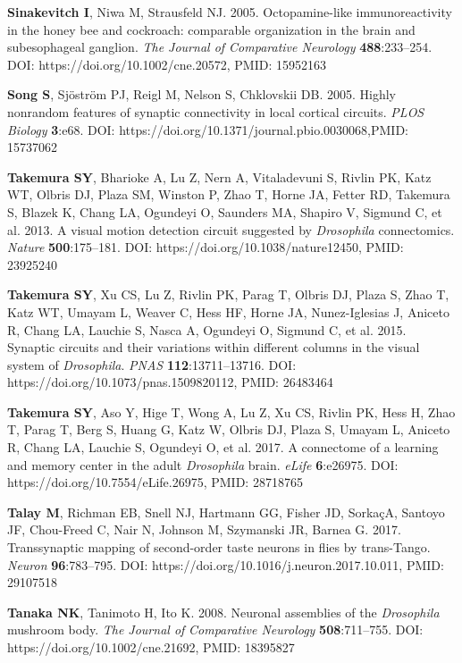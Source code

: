 \documentclass{article}
\begin{document}
\begin{hangpars}
\textbf{Sinakevitch I}, Niwa M, Strausfeld NJ. 2005. Octopamine-like immunoreactivity in the honey bee and cockroach: comparable organization in the brain and subesophageal ganglion. \emph{The Journal of Comparative Neurology} \textbf{488}:233–254. DOI: https://doi.org/10.1002/cne.20572, PMID: 15952163

\textbf{Song S}, Sjöström PJ, Reigl M, Nelson S, Chklovskii DB. 2005. Highly nonrandom features of synaptic connectivity in local cortical circuits. \emph{PLOS Biology} \textbf{3}:e68. DOI: https://doi.org/10.1371/journal.pbio.0030068,PMID: 15737062

\textbf{Takemura SY}, Bharioke A, Lu Z, Nern A, Vitaladevuni S, Rivlin PK, Katz WT, Olbris DJ, Plaza SM, Winston P, Zhao T, Horne JA, Fetter RD, Takemura S, Blazek K, Chang LA, Ogundeyi O, Saunders MA, Shapiro V, Sigmund C, et al. 2013. A visual motion detection circuit suggested by \emph{Drosophila} connectomics. \emph{Nature} \textbf{500}:175–181. DOI: https://doi.org/10.1038/nature12450, PMID: 23925240

\textbf{Takemura SY}, Xu CS, Lu Z, Rivlin PK, Parag T, Olbris DJ, Plaza S, Zhao T, Katz WT, Umayam L, Weaver C, Hess HF, Horne JA, Nunez-Iglesias J, Aniceto R, Chang LA, Lauchie S, Nasca A, Ogundeyi O, Sigmund C, et al. 2015. Synaptic circuits and their variations within different columns in the visual system of \emph{Drosophila}. \emph{PNAS} \textbf{112}:13711–13716. DOI: https://doi.org/10.1073/pnas.1509820112, PMID: 26483464

\textbf{Takemura SY}, Aso Y, Hige T, Wong A, Lu Z, Xu CS, Rivlin PK, Hess H, Zhao T, Parag T, Berg S, Huang G, Katz W, Olbris DJ, Plaza S, Umayam L, Aniceto R, Chang LA, Lauchie S, Ogundeyi O, et al. 2017. A connectome of a learning and memory center in the adult \emph{Drosophila} brain. \emph{eLife} \textbf{6}:e26975. DOI: https://doi.org/10.7554/eLife.26975, PMID: 28718765

\textbf{Talay M}, Richman EB, Snell NJ, Hartmann GG, Fisher JD, SorkaçA, Santoyo JF, Chou-Freed C, Nair N, Johnson M, Szymanski JR, Barnea G. 2017. Transsynaptic mapping of second-order taste neurons in flies by trans-Tango. \emph{Neuron} \textbf{96}:783–795. DOI: https://doi.org/10.1016/j.neuron.2017.10.011, PMID: 29107518

\textbf{Tanaka NK}, Tanimoto H, Ito K. 2008. Neuronal assemblies of the \emph{Drosophila} mushroom body. \emph{The Journal of} \emph{Comparative Neurology} \textbf{508}:711–755. DOI: https://doi.org/10.1002/cne.21692, PMID: 18395827


\end{hangpars}
\end{document}
